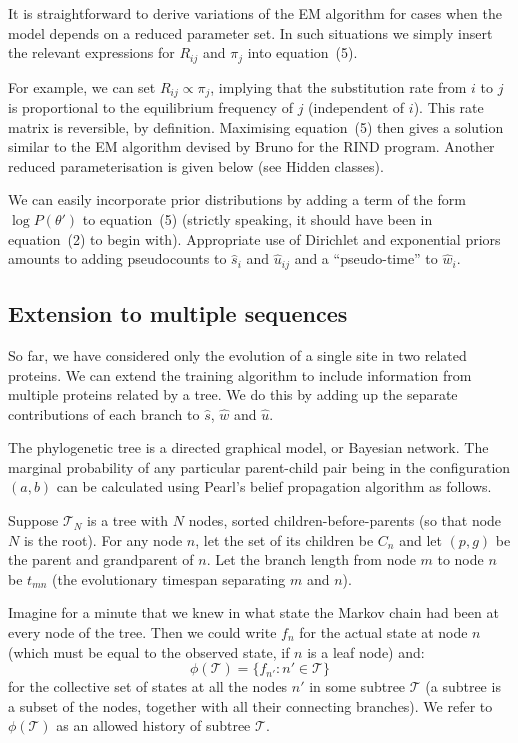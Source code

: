 \documentclass[12pt]{article}
\begin{document}
It is straightforward to derive variations of the EM algorithm for cases when the model depends on a
reduced parameter set. In such situations we simply insert the relevant expressions for $R_{ij}$ and
$\pi_j$ into equation~(5).

For example, we can set $R_{ij} \propto \pi_j$, implying that the substitution rate from $i$ to $j$
is proportional to the equilibrium frequency of $j$ (independent of $i$). This rate matrix is
reversible, by definition. Maximising equation~(5) then gives a solution similar to the EM algorithm
devised by Bruno for the RIND program.\cite{Bruno1996} Another reduced parameterisation is given
below (see Hidden classes).

We can easily incorporate prior distributions by adding a term of the form $\log P(\theta')$ to
equation~(5) (strictly speaking, it should have been in equation~(2) to begin with). Appropriate use
of Dirichlet and exponential priors amounts to adding pseudocounts to $\hat{s}_i$ and $\hat{u}_{ij}$
and a ``pseudo-time'' to $\hat{w}_i$.


\subsection{Extension to multiple sequences}

So far, we have considered only the evolution of a single site in two related proteins. We can
extend the training algorithm to include information from multiple proteins related by a tree. We do
this by adding up the separate contributions of each branch to $\hat{s}$, $\hat{w}$ and $\hat{u}$.

The phylogenetic tree is a directed graphical model, or Bayesian network. The marginal probability
of any particular parent-child pair being in the configuration $(a, b)$ can be calculated using
Pearl's belief propagation algorithm as follows.\cite{Pearl1988}

Suppose $\mathcal{T}_N$ is a tree with $N$ nodes, sorted children-before-parents (so that node $N$
is the root). For any node $n$, let the set of its children be $C_n$ and let $(p, g)$ be the parent
and grandparent of $n$. Let the branch length from node $m$ to node $n$ be $t_{mn}$ (the
evolutionary timespan separating $m$ and $n$).

Imagine for a minute that we knew in what state the Markov chain had been at every node of the tree.
Then we could write $f_n$ for the actual state at node $n$ (which must be equal to the observed
state, if $n$ is a leaf node) and:
\[
\phi(\mathcal{T}) = \{f_{n'} : n' \in \mathcal{T}\}
\]
for the collective set of states at all the nodes $n'$ in some subtree $\mathcal{T}$ (a subtree is a
subset of the nodes, together with all their connecting branches). We refer to $\phi(\mathcal{T})$ as
an allowed history of subtree $\mathcal{T}$.
\end{document}
